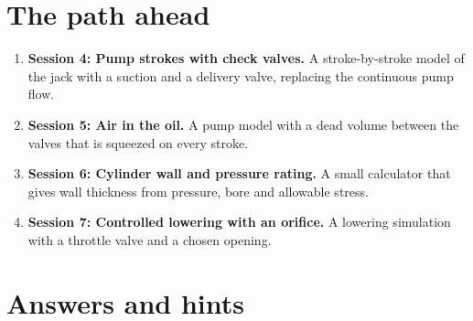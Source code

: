 \documentclass[11pt,a4paper]{article}
\begin{document}
\section{The path ahead}
\begin{enumerate}[nosep]
\item \textbf{Session 4: Pump strokes with check valves.} A stroke-by-stroke model of the jack with a suction and a delivery valve, replacing the continuous pump flow.
\item \textbf{Session 5: Air in the oil.} A pump model with a dead volume between the valves that is squeezed on every stroke.
\item \textbf{Session 6: Cylinder wall and pressure rating.} A small calculator that gives wall thickness from pressure, bore and allowable stress.
\item \textbf{Session 7: Controlled lowering with an orifice.} A lowering simulation with a throttle valve and a chosen opening.
\end{enumerate}

\section{Answers and hints}
\end{document}
